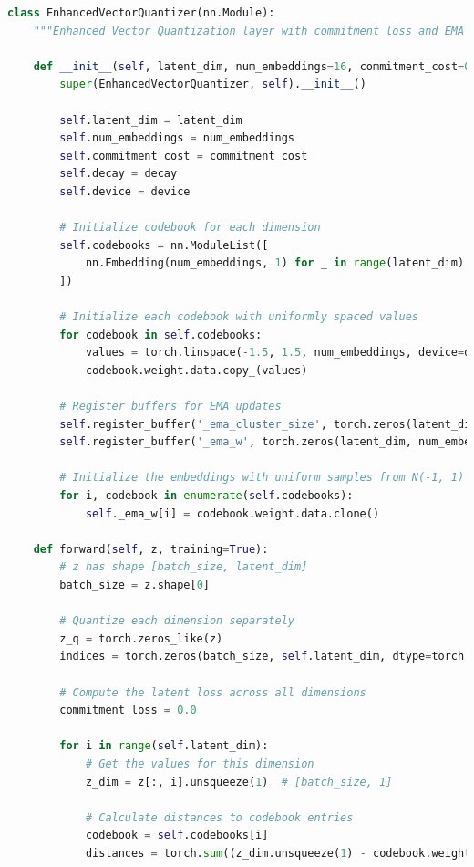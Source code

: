 \documentclass[12pt,openany]{article}
\theoremstyle{definition}
\theoremstyle{definition}
\theoremstyle{definition}
\begin{document}
\begin{lstlisting}[language=Python, caption=Vector Quantizer Implementation]
class EnhancedVectorQuantizer(nn.Module):
    """Enhanced Vector Quantization layer with commitment loss and EMA updates"""

    def __init__(self, latent_dim, num_embeddings=16, commitment_cost=0.25, decay=0.99, device="cpu"):
        super(EnhancedVectorQuantizer, self).__init__()

        self.latent_dim = latent_dim
        self.num_embeddings = num_embeddings
        self.commitment_cost = commitment_cost
        self.decay = decay
        self.device = device

        # Initialize codebook for each dimension
        self.codebooks = nn.ModuleList([
            nn.Embedding(num_embeddings, 1) for _ in range(latent_dim)
        ])

        # Initialize each codebook with uniformly spaced values
        for codebook in self.codebooks:
            values = torch.linspace(-1.5, 1.5, num_embeddings, device=device).unsqueeze(1)
            codebook.weight.data.copy_(values)

        # Register buffers for EMA updates
        self.register_buffer('_ema_cluster_size', torch.zeros(latent_dim, num_embeddings, device=device))
        self.register_buffer('_ema_w', torch.zeros(latent_dim, num_embeddings, 1, device=device))

        # Initialize the embeddings with uniform samples from N(-1, 1)
        for i, codebook in enumerate(self.codebooks):
            self._ema_w[i] = codebook.weight.data.clone()

    def forward(self, z, training=True):
        # z has shape [batch_size, latent_dim]
        batch_size = z.shape[0]

        # Quantize each dimension separately
        z_q = torch.zeros_like(z)
        indices = torch.zeros(batch_size, self.latent_dim, dtype=torch.long, device=self.device)

        # Compute the latent loss across all dimensions
        commitment_loss = 0.0

        for i in range(self.latent_dim):
            # Get the values for this dimension
            z_dim = z[:, i].unsqueeze(1)  # [batch_size, 1]

            # Calculate distances to codebook entries
            codebook = self.codebooks[i]
            distances = torch.sum((z_dim.unsqueeze(1) - codebook.weight) ** 2, dim=2)


\end{lstlisting}
\end{document}
